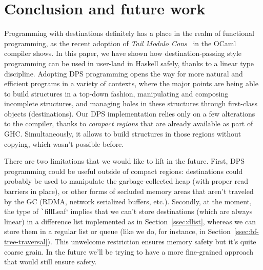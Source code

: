 \documentclass[english]{jflart}
\begin{document}
\section{Conclusion and future work}

Programming with destinations definitely has a place in the realm of functional programming, as the recent adoption of \emph{Tail Modulo Cons}~\cite{bour_tmc_2021} in the OCaml compiler shows. In this paper, we have shown how destination-passing style programming can be used in user-land in Haskell safely, thanks to a linear type discipline. Adopting DPS programming opens the way for more natural and efficient programs in a variety of contexts, where the major points are being able to build structures in a top-down fashion, manipulating and composing incomplete structures, and managing holes in these structures through first-class objects (destinations). Our DPS implementation relies only on a few alterations to the compiler, thanks to \emph{compact regions} that are already available as part of GHC. Simultaneously, it allows to build structures in those regions without copying, which wasn't possible before.

There are two limitations that we would like to lift in the future. First, DPS programming could be useful outside of compact regions: destinations could probably be used to manipulate the garbage-collected heap (with proper read barriers in place), or other forms of secluded memory areas that aren't traveled by the GC (RDMA, network serialized buffers, etc.). Secondly, at the moment, the type of \texttt`fillLeaf` implies that we can't store destinations (which are always linear) in a difference list implemented as in Section~\ref{ssec:dlist}, whereas we can store them in a regular list or queue (like we do, for instance, in Section~\ref{ssec:bf-tree-traversal}). This unwelcome restriction ensures memory safety but it's quite coarse grain. In the future we'll be trying to have a more fine-grained approach that would still ensure safety.

\clearpage{}
{}

\end{document}
